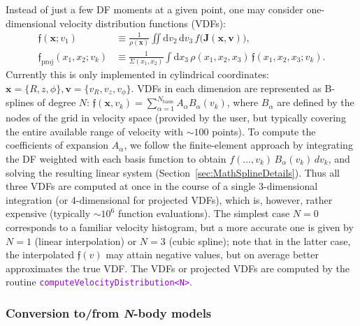 \documentclass[12pt]{article}
\newcommand{\Nbody}{\textsl{N}-body\xspace}
\newcommand{\ttt}[1]{\textcolor{darkviolet}{\texttt{#1}}}
\renewcommand{\d}{\mathrm{d}}
\newcommand{\bv}{\boldsymbol{v}}
\newcommand{\bx}{\boldsymbol{x}}
\newcommand{\bJ}{\boldsymbol{J}}
\begin{document}
Instead of just a few DF moments at a given point, one may consider one-dimensional velocity distribution functions (VDFs):
\begin{align*}
\mathfrak{f}(\bx;v_1) &\equiv \frac{1}{\rho(\bx)} \iint \d v_2\,\d v_3\, f\big(\bJ(\bx,\bv)\big) ,\\
\mathfrak{f}_\mathrm{proj}(x_1,x_2;v_k) &\equiv \frac{1}{\Sigma(x_1,x_2)} \int \d x_3\, \rho(x_1,x_2,x_3)\,\mathfrak{f}(x_1,x_2,x_3;v_k) .
\end{align*}
Currently this is only implemented in cylindrical coordinates: $\bx=\{R,z,\phi\}, \bv=\{v_R,v_z,v_\phi\}$.
VDFs in each dimension are represented as B-splines of degree $N$: $\mathfrak{f}(\bx, v_k) = \sum_{\alpha=1}^{N_\mathrm{basis}} A_\alpha B_\alpha(v_k)$, where $B_\alpha$ are defined by the nodes of the grid in velocity space (provided by the user, but typically covering the entire available range of velocity with $\sim 100$ points). To compute the coefficients of expansion $A_\alpha$, we follow the finite-element approach by integrating the DF weighted with each basis function to obtain $f(\dots,v_k)\,B_\alpha(v_k)\,dv_k$, and solving the resulting linear system (Section~\ref{sec:MathSplineDetails}). Thus all three VDFs are computed at once in the course of a single 3-dimensional integration (or 4-dimensional for projected VDFs), which is, however, rather expensive (typically $\sim 10^6$ function evaluations). The simplest case $N=0$ corresponds to a familiar velocity histogram, but a more accurate one is given by $N=1$ (linear interpolation) or $N=3$ (cubic spline); note that in the latter case, the interpolated $\mathfrak{f}(v)$ may attain negative values, but on average better approximates the true VDF.
The VDFs or projected VDFs are computed by the routine \ttt{computeVelocityDistribution<N>}.


\subsubsection{Conversion to/from \Nbody models}  \label{sec:Nbody}
\end{document}
